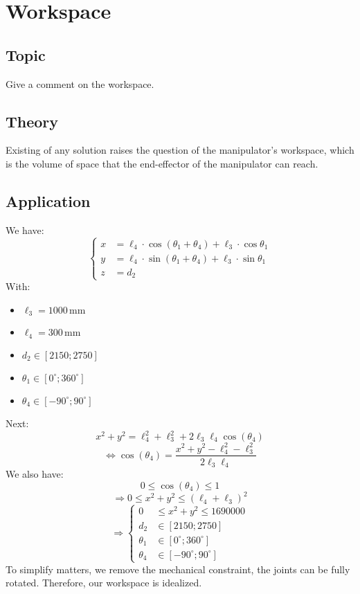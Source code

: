 \chapter{Workspace}
\section{Topic}
Give a comment on the workspace.
\section{Theory}
Existing of any solution raises the question of the manipulator's workspace, which is the volume of space that the end-effector of the manipulator can reach.
\section{Application}
We have: 
\[
\left\{
\begin{aligned}
x &= \ell_4 \cdot \cos(\theta_1 + \theta_4) + \ell_3 \cdot \cos\theta_1 \\
y &= \ell_4 \cdot \sin(\theta_1 + \theta_4) + \ell_3 \cdot \sin\theta_1 \\
z &= d_2
\end{aligned}
\right.
\]
With:
\begin{itemize}
    \item $\ell_3 = 1000\,\text{mm}$
    \item $\ell_4 = 300\,\text{mm}$
    \item $d_2 \in [2150; 2750]$
    \item $\theta_1 \in [0^\circ; 360^\circ]$
    \item $\theta_4 \in [-90^\circ; 90^\circ]$
\end{itemize}
Next:
\[
    x^2 + y^2 = \ell_4^2 + \ell_3^2 + 2\ell_3 \ell_4 \cos(\theta_4)
\]
\[
    \Leftrightarrow \cos(\theta_4) = \frac{x^2 + y^2 - \ell_4^2 - \ell_3^2}{2 \ell_3 \ell_4}
\]
We also have:
\[
    0 \leq \cos(\theta_4) \leq 1
\]
\[
    \Rightarrow 0 \leq x^2 + y^2 \leq (\ell_4 + \ell_3)^2
\]
\[
\Rightarrow 
\left\{
\begin{aligned}
0 &\leq x^2 + y^2 \leq 1690000 \\
d_2 &\in [2150; 2750] \\
\theta_1 &\in [0^\circ; 360^\circ] \\
\theta_4 &\in [-90^\circ; 90^\circ]
\end{aligned}
\right.
\]
To simplify matters, we remove the mechanical constraint, the joints can be fully rotated. Therefore, our workspace is idealized.

